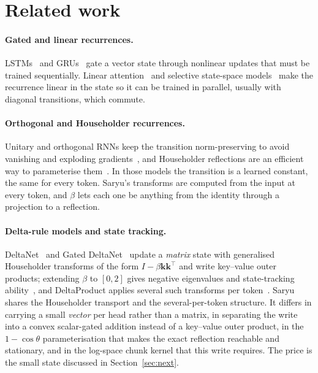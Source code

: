 \documentclass[10pt]{article}
\begin{document}
\section{Related work}

\paragraph{Gated and linear recurrences.} LSTMs~\cite{hochreiter1997} and GRUs~\cite{cho2014} gate a
vector state through nonlinear updates that must be trained sequentially. Linear attention~\cite{katharopoulos2020}
and selective state-space models~\cite{gu2023mamba} make the recurrence linear in the state so it can be
trained in parallel, usually with diagonal transitions, which commute.

\paragraph{Orthogonal and Householder recurrences.} Unitary and orthogonal RNNs keep the transition
norm-preserving to avoid vanishing and exploding gradients~\cite{arjovsky2016}, and Householder
reflections are an efficient way to parameterise them~\cite{mhammedi2017}. In those models the transition
is a learned constant, the same for every token. Saryu's transforms are computed from the input at every
token, and $\beta$ lets each one be anything from the identity through a projection to a reflection.

\paragraph{Delta-rule models and state tracking.} DeltaNet~\cite{yang2024delta} and Gated
DeltaNet~\cite{yang2024gated} update a \emph{matrix} state with generalised Householder transforms of the
form $I-\beta\mathbf{k}\mathbf{k}^\top$ and write key--value outer products; extending $\beta$ to $[0,2]$
gives negative eigenvalues and state-tracking ability~\cite{grazzi2024}, and DeltaProduct applies several
such transforms per token~\cite{siems2025}. Saryu shares the Householder transport and the
several-per-token structure. It differs in carrying a small \emph{vector} per head rather than a matrix, in
separating the write into a convex scalar-gated addition instead of a key--value outer product, in the
$1-\cos\theta$ parameterisation that makes the exact reflection reachable and stationary, and in the
log-space chunk kernel that this write requires. The price is the small state discussed in
Section~\ref{sec:next}.
\end{document}
